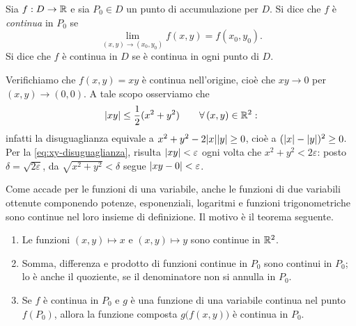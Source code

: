 \begin{definizione}[Continuità]\label{def:continua-piano}
Sia $f:D\to\mathbb{R}$ e sia $P_{0}\in D$ un punto di accumulazione per $D$. Si dice che $f$ è
\emph{continua} in $P_{0}$ se
\begin{equation}\label{eq:continua-piano}
  \lim_{(x,y)\to(x_{0},y_{0})}f(x,y)=f(x_{0},y_{0}).
\end{equation}
Si dice che $f$ è continua in $D$ se è continua in ogni punto di $D$.
\end{definizione}

\begin{esempio}\label{es:xy-continua}
Verifichiamo che $f(x,y)=xy$ è continua nell'origine, cioè che $xy\to0$ per
$(x,y)\to(0,0)$. A tale scopo osserviamo che
\begin{equation}\label{eq:xy-disuguaglianza}
  \lvert xy\rvert\le\frac12(x^{2}+y^{2}) \qquad\forall\,(x,y)\in\mathbb{R}^{2}:
\end{equation}
infatti la disuguaglianza equivale a $x^{2}+y^{2}-2\lvert x\rvert\lvert y\rvert\ge0$, cioè a
$(\lvert x\rvert-\lvert y\rvert)^{2}\ge0$. Per la \eqref{eq:xy-disuguaglianza}, risulta $\lvert xy\rvert<\varepsilon$
ogni volta che $x^{2}+y^{2}<2\varepsilon$: posto $\delta=\sqrt{2\varepsilon}$, da
$\sqrt{x^{2}+y^{2}}<\delta$ segue $\lvert xy-0\rvert<\varepsilon$.
\end{esempio}

Come accade per le funzioni di una variabile, anche le funzioni di due variabili
ottenute componendo potenze, esponenziali, logaritmi e funzioni trigonometriche sono
continue nel loro insieme di definizione. Il motivo è il teorema seguente.

\begin{teorema}\label{teo:continue-piano}
\begin{enumerate}[label=\textup{(\roman*)}]
  \item Le funzioni $(x,y)\mapsto x$ e $(x,y)\mapsto y$ sono continue in $\mathbb{R}^{2}$.
  \item Somma, differenza e prodotto di funzioni continue in $P_{0}$ sono continui in
  $P_{0}$; lo è anche il quoziente, se il denominatore non si annulla in $P_{0}$.
  \item Se $f$ è continua in $P_{0}$ e $g$ è una funzione di una variabile continua nel
  punto $f(P_{0})$, allora la funzione composta $g\bigl(f(x,y)\bigr)$ è continua in $P_{0}$.
\end{enumerate}
\end{teorema}

